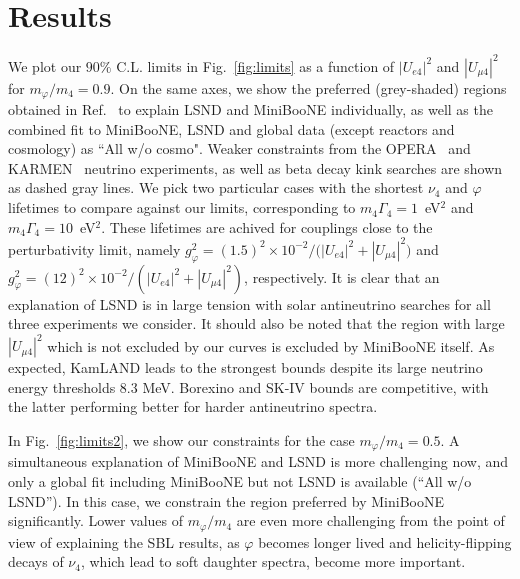 \documentclass[
reprint,
superscriptaddress,
showpacs,
preprintnumbers,
nofootinbib,
nobibnotes,
amsmath,
amssymb, 
aps,
prd,
floatfix
]{revtex4-1}
\newcommand{\reffig}[1]{Fig.~\ref{#1}}
\renewcommand{\phi}{\varphi}
\begin{document}
\section{Results}\label{sec:results}

We plot our $90\%$ C.L. limits in \reffig{fig:limits} as a function of $|U_{e4}|^2$ and $|U_{\mu4}|^2$ for $m_\phi/m_4=0.9$. On the same axes, we show the preferred (grey-shaded) regions obtained in Ref.~\cite{Dentler:2019dhz} to explain LSND and MiniBooNE individually, as well as the combined fit to MiniBooNE, LSND and global data (except reactors and cosmology) as ``All w/o cosmo". Weaker constraints from the OPERA~\cite{Agafonova:2013xsk} and KARMEN~\cite{Armbruster:2002mp} neutrino experiments, as well as beta decay kink searches are shown as dashed gray lines.
We pick two particular cases with the shortest $\nu_4$ and $\phi$ lifetimes to compare against our limits, corresponding to $m_4 \Gamma_4= 1$~eV$^2$  and $m_4\Gamma_4=10$~eV$^2$. These lifetimes are achived for couplings close to the perturbativity limit, namely $g_\phi^2 = (1.5)^2 \times 10^{-2}/({|U_{e4}|^2+|U_{\mu4}|^2)} $ and $g_\phi^2 =  (12)^2 \times 10^{-2}/{(|U_{e4}|^2+|U_{\mu4}|^2)}$, respectively. It is clear that an explanation of LSND is in large tension with solar antineutrino searches for all three experiments we consider. It should also be noted that the region with large $|U_{\mu4}|^2$ which is not excluded by our curves is excluded by MiniBooNE itself. As expected, KamLAND leads to the strongest bounds despite its large neutrino energy thresholds $8.3$ MeV. Borexino and SK-IV bounds are competitive, with the latter performing better for harder antineutrino spectra.

In \reffig{fig:limits2}, we show our constraints for the case $m_\phi/m_4=0.5$. A simultaneous explanation of MiniBooNE and LSND is more challenging now, and only a global fit including MiniBooNE but not LSND is available (``All w/o LSND''). In this case, we constrain the region preferred by MiniBooNE significantly. Lower values of $m_\phi/m_4$ are even more challenging from the point of view of explaining the SBL results, as $\phi$ becomes longer lived and helicity-flipping decays of $\nu_4$, which lead to soft daughter spectra, become more important.
\end{document}

